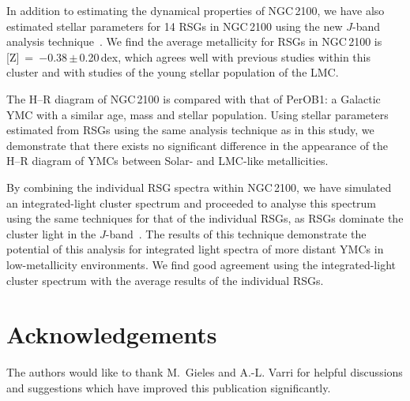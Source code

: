 \documentclass[useAMS,usenatbib]{mn2e}
\begin{document}
In addition to estimating the dynamical properties of NGC\,2100, we have also %
estimated stellar parameters for 14 RSGs in NGC\,2100 using the new $J$-band analysis technique~\citep{2010MNRAS.407.1203D}.
We find the average metallicity for RSGs in NGC\,2100 is [Z]~=~$-$0.38\,$\pm$\,0.20\,dex, which agrees well with previous studies within this cluster and with studies of the young stellar population of the LMC.

The H--R diagram of NGC\,2100 is compared with that of PerOB1: a Galactic YMC with a similar age, mass and stellar population.
Using stellar parameters estimated from RSGs using the same analysis technique as in this study, we demonstrate that there exists no significant difference in the appearance of the H--R diagram of YMCs between Solar- and LMC-like metallicities.


By combining the individual RSG spectra within NGC\,2100, we have simulated an integrated-light cluster spectrum and proceeded to analyse this spectrum using the same techniques for that of the individual RSGs, as RSGs dominate the cluster light in the $J$-band~\citep{2013MNRAS.430L..35G}.
The results of this technique demonstrate the potential of this analysis for integrated light spectra of more distant YMCs in low-metallicity environments.
We find good agreement using the integrated-light cluster spectrum with the average results of the individual RSGs.

\section*{Acknowledgements}
The authors would like to thank M.~Gieles and A.-L. Varri for helpful discussions and suggestions which have improved this publication significantly.


% 
\end{document}
